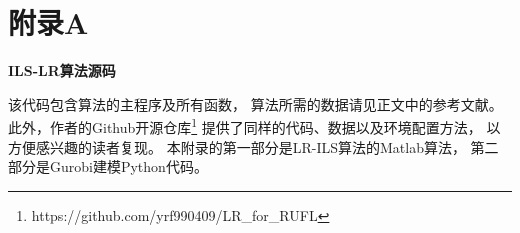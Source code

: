 \setlength{\baselineskip}{16pt}
\chapter{附录A}
\label{cha:app1}
\begin{center}
\textbf{ILS-LR算法源码}
\end{center}

\indent
{}
该代码包含算法的主程序及所有函数，
算法所需的数据请见正文中的参考文献。
此外，作者的Github开源仓库\footnote{https:\slash \slash github.com\slash yrf990409\slash LR\_for\_RUFL}
提供了同样的代码、数据以及环境配置方法，
以方便感兴趣的读者复现。
本附录的第一部分是LR-ILS算法的Matlab算法，
第二部分是Gurobi建模Python代码。

